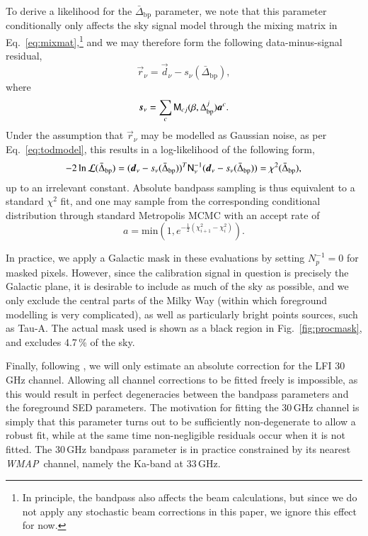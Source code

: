 \documentclass[twocolumn]{aa}
\def\WMAP{\textit{WMAP}}
\renewcommand{\d}[0]{\vec{d}}
\newcommand{\s}[0]{\vec{s}}
\renewcommand{\a}[0]{\vec{a}}
\newcommand{\N}[0]{\tens{N}}
\newcommand{\M}[0]{\tens{M}}
\renewcommand{\r}[0]{\vec{r}}
\newcommand{\Dbp}[0]{\Delta_{\mathrm{bp}}}
\newcommand{\?}[1]{\textcolor{red}{{\bf [#1]}}}
\begin{document}
To derive a likelihood for the $\bar{\Delta}_{\mathrm{bp}}$ parameter,
we note that this parameter conditionally only affects the sky signal
model through the mixing matrix in Eq.~\eqref{eq:mixmat},\footnote{In
  principle, the bandpass also affects the beam calculations, but
  since we do not apply any stochastic beam corrections in this paper,
  we ignore this effect for now.} and we may therefore form the
following data-minus-signal residual,
\begin{equation}
  \r_{\nu} = \d_{\nu}-s_{\nu}(\bar{\Delta}_{\mathrm{bp}}),
\end{equation}
where 
\begin{equation}
  \s_{\nu} = \sum_{c} \M_{cj}(\beta, \Dbp^{j})\a^c.
\end{equation}
Under the assumption that $\r_{\nu}$ may be modelled as Gaussian
noise, as per Eq.~\eqref{eq:todmodel}, this results in a
log-likelihood of the following form,
\begin{equation}
  -2\ln \mathcal{L}(\bar{\Delta}_{\mathrm{bp}}) =
  (\d_{\nu}-s_{\nu}(\bar{\Delta}_{\mathrm{bp}}))^T\N_{\nu}^{-1}(\d_{\nu}-s_{\nu}(\bar{\Delta}_{\mathrm{bp}}))
  = \chi^2(\bar{\Delta}_{\mathrm{bp}}),
  \label{eq:chisq}
\end{equation}
up to an irrelevant constant. Absolute bandpass sampling is thus
equivalent to a standard $\chi^2$ fit, and one may sample from the
corresponding conditional distribution through standard Metropolis
MCMC with an accept rate of
\begin{equation}
  a = \mathrm{min}(1,e^{-\frac{1}{2}(\chi^2_{i+1}-\chi^2_{i})}).
  \label{eq:metropolis}
\end{equation}

In practice, we apply a Galactic mask in these evaluations by setting
$N_{p}^{-1}=0$ for masked pixels. However, since the calibration signal in
question is precisely the Galactic plane, it is desirable to include
as much of the sky as possible, and we only exclude the central parts
of the Milky Way (within which foreground modelling is very
complicated), as well as particularly bright points sources, such as
Tau-A. The actual mask used is shown as a black region in
Fig.~\ref{fig:procmask}, and excludes 4.7\,\% of the sky.

Finally, following \citet{planck2014-a12}, we will only estimate an
absolute correction for the LFI 30\,GHz channel. Allowing all channel
corrections to be fitted freely is impossible, as this would result in
perfect degeneracies between the bandpass parameters and the
foreground SED parameters. The motivation for fitting the 30\,GHz
channel is simply that this parameter turns out to be sufficiently
non-degenerate to allow a robust fit, while at the same time
non-negligible residuals occur when it is not fitted. The 30\,GHz
bandpass parameter is in practice constrained by its
nearest \WMAP\ channel, namely the Ka-band at 33\,GHz.
\end{document}
